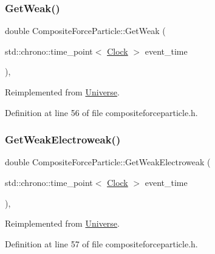 \subsubsection{\texorpdfstring{Get\+Weak()}{GetWeak()}}
{\footnotesize\ttfamily double Composite\+Force\+Particle\+::\+Get\+Weak (\begin{DoxyParamCaption}\item[{std\+::chrono\+::time\+\_\+point$<$ \mbox{\hyperlink{universe_8h_a0ef8d951d1ca5ab3cfaf7ab4c7a6fd80}{Clock}} $>$}]{event\+\_\+time }\end{DoxyParamCaption})\hspace{0.3cm}{\ttfamily [inline]}, {\ttfamily [virtual]}}



Reimplemented from \mbox{\hyperlink{class_universe_a4476b7e0a3fc1764909f556257fd9ec7}{Universe}}.



Definition at line 56 of file compositeforceparticle.\+h.

\mbox{\label{class_composite_force_particle_a27762218af4e3c021c89ff4792d81b41}} 
\subsubsection{\texorpdfstring{Get\+Weak\+Electroweak()}{GetWeakElectroweak()}}
{\footnotesize\ttfamily double Composite\+Force\+Particle\+::\+Get\+Weak\+Electroweak (\begin{DoxyParamCaption}\item[{std\+::chrono\+::time\+\_\+point$<$ \mbox{\hyperlink{universe_8h_a0ef8d951d1ca5ab3cfaf7ab4c7a6fd80}{Clock}} $>$}]{event\+\_\+time }\end{DoxyParamCaption})\hspace{0.3cm}{\ttfamily [inline]}, {\ttfamily [virtual]}}



Reimplemented from \mbox{\hyperlink{class_universe_a645299738e6b798a037f2a15a2e7cf4d}{Universe}}.



Definition at line 57 of file compositeforceparticle.\+h.

\mbox{\label{class_composite_force_particle_afe5738b3ba1382dad085fa1ef39963b3}} 
